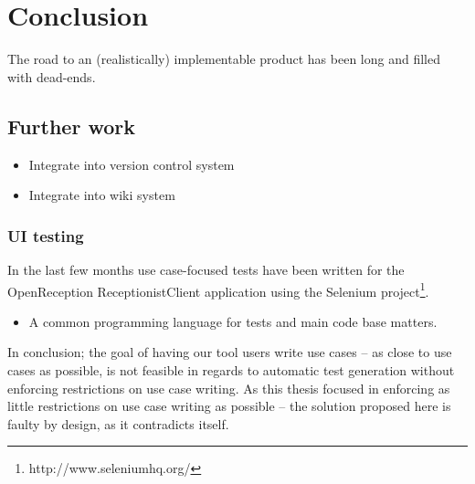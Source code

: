 \chapter{Conclusion}
The road to an (realistically) implementable product has been long and filled with dead-ends.
\section{Further work}
\begin{itemize}
  \item Integrate into version control system
  \item Integrate into wiki system
\end{itemize}


\subsection{UI testing}
In the last few months use case-focused tests have been written for the OpenReception ReceptionistClient application using the Selenium project\footnote{http://www.seleniumhq.org/}.

\begin{itemize}
  \item A common programming language for tests and main code base matters.
\end{itemize}


In conclusion; the goal of having our tool users write use cases -- as close to use cases as possible, is not feasible in regards to automatic test generation without enforcing restrictions on use case writing. As this thesis focused in enforcing as little restrictions on use case writing as possible -- the solution proposed here is faulty by design, as it contradicts itself.
